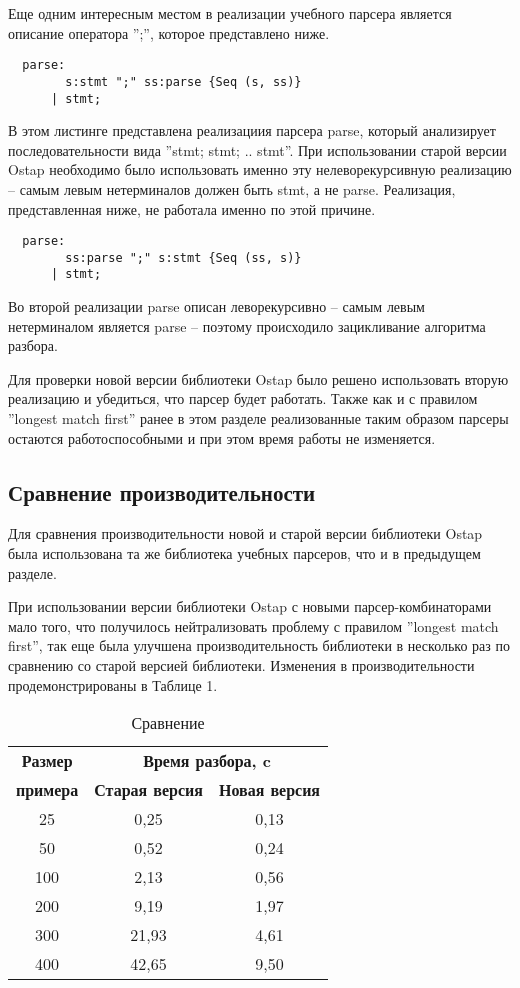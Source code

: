 \documentclass[conference]{IEEEtran}
\begin{document}
Еще одним интересным местом в реализации учебного парсера является описание оператора '';'', которое представлено ниже.

\begin{lstlisting}
  parse:
        s:stmt ";" ss:parse {Seq (s, ss)}
      | stmt;
\end{lstlisting}

В этом листинге представлена реализациия парсера parse, который анализирует последовательности вида ''stmt; stmt; .. stmt''. При использовании старой версии Ostap необходимо было использовать именно эту нелеворекурсивную реализацию -- самым левым нетерминалов должен быть stmt, а не parse. Реализация, представленная ниже, не работала именно по этой причине.

\begin{lstlisting}
  parse:
        ss:parse ";" s:stmt {Seq (ss, s)}
      | stmt;
\end{lstlisting}

Во второй реализации parse описан леворекурсивно -- самым левым нетерминалом является parse -- поэтому происходило зацикливание алгоритма разбора. 

Для проверки новой версии библиотеки Ostap было решено использовать вторую реализацию и убедиться, что парсер будет работать. Также как и с правилом ''longest match first'' ранее в этом разделе реализованные таким образом парсеры остаются работоспособными и при этом время работы не изменяется.

\subsection{Сравнение производительности}

Для сравнения производительности новой и старой версии библиотеки Ostap была использована та же библиотека учебных парсеров, что и в предыдущем разделе.

При использовании версии библиотеки Ostap с новыми парсер-комбинаторами мало того, что получилось нейтрализовать проблему с правилом ''longest match first'', так еще была улучшена производительность библиотеки в несколько раз по сравнению со старой версией библиотеки. Изменения в производительности продемонстрированы в Таблице 1. 

\begin{table}[htbp]
\caption{Сравнение}
\begin{center}
\begin{tabular}{|c|c|c|}
\hline
\textbf{Размер} & \multicolumn{2}{|c|}{\textbf{Время разбора, c}} \\
\cline{2-3} 
\textbf{примера} & \textbf{Старая версия} & \textbf{Новая версия} \\
\hline
25& 0,25& 0,13 \\
\hline
50& 0,52& 0,24 \\
\hline
100& 2,13& 0,56 \\
\hline
200& 9,19& 1,97 \\
\hline
300& 21,93& 4,61 \\
\hline
400& 42,65& 9,50 \\
\hline
\end{tabular}
\label{tab1}
\end{center}
\end{table}
\end{document}
